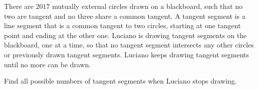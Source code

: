 There are 
$2017$
mutually external circles drawn on a blackboard, such that no two are tangent and no three share a common tangent. A tangent segment is a line segment that is a common tangent to two circles, starting at one tangent point and ending at the other one. Luciano is drawing tangent segments on the blackboard, one at a time, so that no tangent segment intersects any other circles or previously drawn tangent segments. Luciano keeps drawing tangent segments until no more can be drawn.


Find all possible numbers of tangent segments when Luciano stops drawing.